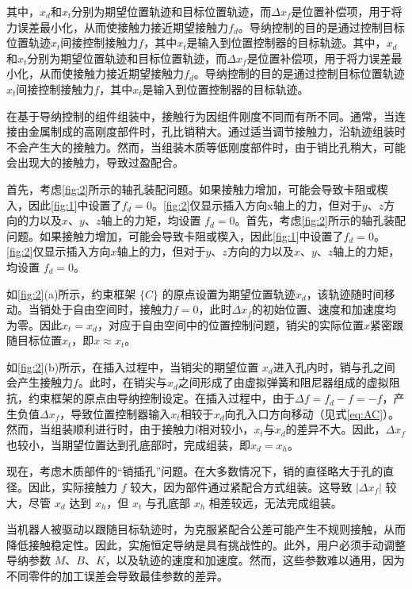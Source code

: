 \documentclass{Diploma}
\begin{document}
其中，$x_d$和$x_t$分别为期望位置轨迹和目标位置轨迹，而$\Delta x_f$是位置补偿项，用于将力误差最小化，从而使接触力接近期望接触力$f_d$。导纳控制的目的是通过控制目标位置轨迹$x_t$间接控制接触力$f$，其中$x_t$是输入到位置控制器的目标轨迹。其中，$x_d$和$x_t$分别为期望位置轨迹和目标位置轨迹，而$\Delta x_f$是位置补偿项，用于将力误差最小化，从而使接触力接近期望接触力$f_d$。导纳控制的目的是通过控制目标位置轨迹$x_t$间接控制接触力$f$，其中$x_t$是输入到位置控制器的目标轨迹。

在基于导纳控制的组件组装中，接触行为因组件刚度不同而有所不同。通常，当连接由金属制成的高刚度部件时，孔比销稍大。通过适当调节接触力，沿轨迹组装时不会产生大的接触力。然而，当组装木质等低刚度部件时，由于销比孔稍大，可能会出现大的接触力，导致过盈配合。

首先，考虑\ref{fig:2}所示的轴孔装配问题。如果接触力增加，可能会导致卡阻或楔入，因此\ref{fig:1}中设置了$f_d=0$。\ref{fig:2}仅显示插入方向x轴上的力，但对于$y$、$z$方向的力以及$x$、$y$、$z$轴上的力矩，均设置 $f_d=0$。首先，考虑\ref{fig:2}所示的轴孔装配问题。如果接触力增加，可能会导致卡阻或楔入，因此\ref{fig:1}中设置了$f_d=0$。\ref{fig:2}仅显示插入方向$x$轴上的力，但对于$y$、$z$方向的力以及$x$、$y$、$z$轴上的力矩，均设置 $f_d=0$。

%

如\ref{fig:2}(a)所示，约束框架 $\{C\}$ 的原点设置为期望位置轨迹$x_d$，该轨迹随时间移动。当销处于自由空间时，接触力$f=0$，此时$\Delta x_f$的初始位置、速度和加速度均为零。因此$x_t=x_d$，对应于自由空间中的位置控制问题，销尖的实际位置$x$紧密跟随目标位置$x_t$，即$x\approx x_t$。

如\ref{fig:2}(b)所示，在插入过程中，当销尖的期望位置 $x_d$进入孔内时，销与孔之间会产生接触力$f$。此时，在销尖与$x_d$之间形成了由虚拟弹簧和阻尼器组成的虚拟阻抗，约束框架的原点由导纳控制设定。在插入过程中，由于$\Delta f=f_d-f=-f$，产生负值$\Delta x_f$，导致位置控制器输入$x_t$相较于$x_d$向孔入口方向移动（见式\eqref{eq:AC}）。然而，当组装顺利进行时，由于接触力f相对较小，$x_t$与$x_d$的差异不大。因此，$\Delta x_f$也较小，当期望位置达到孔底部时，完成组装，即$x_d=x_h$。

现在，考虑木质部件的“销插孔”问题。在大多数情况下，销的直径略大于孔的直径。因此，实际接触力 $f$ 较大，因为部件通过紧配合方式组装。这导致 $|\Delta x_f|$ 较大，尽管 $x_d$ 达到 $x_h$，但 $x_t$ 与孔底部 $x_h$ 相差较远，无法完成组装。

当机器人被驱动以跟随目标轨迹时，为克服紧配合公差可能产生不规则接触，从而降低接触稳定性。因此，实施恒定导纳是具有挑战性的。此外，用户必须手动调整导纳参数 $M$、$B$、$K$，以及轨迹的速度和加速度。然而，这些参数难以通用，因为不同零件的加工误差会导致最佳参数的差异。
\end{document}
